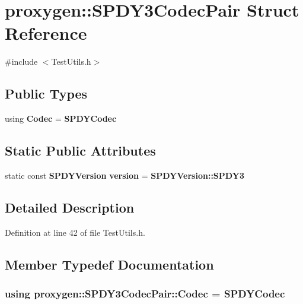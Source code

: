 \section{proxygen\+:\+:S\+P\+D\+Y3\+Codec\+Pair Struct Reference}
\label{structproxygen_1_1SPDY3CodecPair}


{\ttfamily \#include $<$Test\+Utils.\+h$>$}

\subsection*{Public Types}
\begin{DoxyCompactItemize}
\item 
using {\bf Codec} = {\bf S\+P\+D\+Y\+Codec}
\end{DoxyCompactItemize}
\subsection*{Static Public Attributes}
\begin{DoxyCompactItemize}
\item 
static const {\bf S\+P\+D\+Y\+Version} {\bf version} = {\bf S\+P\+D\+Y\+Version\+::\+S\+P\+D\+Y3}
\end{DoxyCompactItemize}


\subsection{Detailed Description}


Definition at line 42 of file Test\+Utils.\+h.



\subsection{Member Typedef Documentation}
\subsubsection[{Codec}]{\setlength{\rightskip}{0pt plus 5cm}using {\bf proxygen\+::\+S\+P\+D\+Y3\+Codec\+Pair\+::\+Codec} =  {\bf S\+P\+D\+Y\+Codec}}\label{structproxygen_1_1SPDY3CodecPair_aa898e3fa86048356dd7ce49d145bf255}


